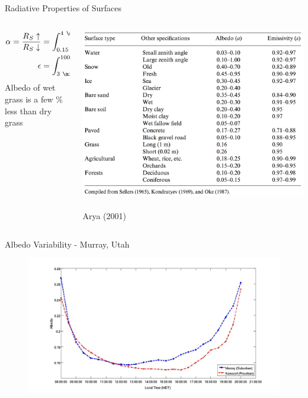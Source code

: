 \begin{frame}{Radiative Properties of Surfaces}
\begin{columns}[T]
\begin{column}{.4\textwidth}
    \begin{minipage}[c][0.5\textheight][c]{\linewidth}
    \begin{align*}
    \alpha = \frac{R_S\uparrow}{R_S\downarrow} &= \int^{4\ \micro\metre}_{0.15\ \micro\metre} \alpha_\lambda d\lambda\\
    \epsilon &= \int^{100\ \micro\metre}_{3\ \micro\metre} \epsilon_\lambda d\lambda
    \end{align*}
    Albedo of wet grass is a few \% less than dry grass
      \end{minipage}
    \end{column}
    \begin{column}{.6\textwidth}
    \includegraphics[width=1\textwidth]{fig21.png}
	\centering \tiny~\\Arya (2001)
    \end{column}
  \end{columns} 
\end{frame}


\begin{frame}{Albedo Variability - Murray, Utah}
\begin{figure}
	\includegraphics[width=\textwidth]{fig22.png}
\end{figure}
\end{frame}

